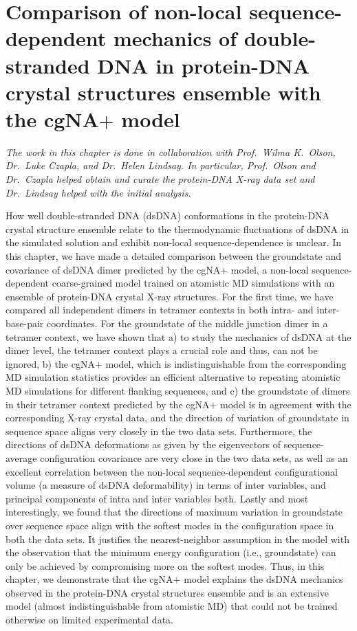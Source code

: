 \chapter{Comparison of non-local sequence-dependent mechanics of double-stranded DNA in protein-DNA crystal structures ensemble with the cgNA$+$ model}\label{c5}
\textit{The work in this chapter is done in collaboration with Prof.~Wilma K.~Olson, Dr.~Luke Czapla, and Dr.~Helen Lindsay.
In particular, Prof.~Olson and Dr.~Czapla helped obtain and curate the protein-DNA X-ray data set and Dr.~Lindsay helped with the initial analysis.}

How well double-stranded DNA (dsDNA) conformations in the protein-DNA crystal structure ensemble relate to the thermodynamic fluctuations of dsDNA in the simulated solution and exhibit non-local sequence-dependence is unclear.
In this chapter, we have made a detailed comparison between the groundstate and covariance of dsDNA dimer predicted by the cgNA$+$ model, a non-local sequence-dependent coarse-grained model trained on atomistic MD simulations with an ensemble of protein-DNA crystal X-ray structures.
For the first time, we have compared all independent dimers in tetramer contexts in both intra- and inter-base-pair coordinates. For the groundstate of the middle junction dimer in a tetramer context, we have shown that
a) to study the mechanics of dsDNA at the dimer level, the tetramer context plays a crucial role and thus, can not be ignored, b) the cgNA$+$ model, which is indistinguishable from the corresponding MD simulation statistics provides an efficient alternative to repeating atomistic MD simulations for different flanking sequences, and
c) the groundstate of dimers in their tetramer context predicted by the cgNA$+$ model is in agreement with the corresponding X-ray crystal data, and the direction of variation of groundstate in sequence space aligns very closely in the two data sets.
Furthermore, the directions of dsDNA deformations as given by the eigenvectors of sequence-average configuration covariance are very close in the two data sets, as well as an excellent correlation between the non-local sequence-dependent configurational volume (a measure of dsDNA deformability) in terms of inter variables, and principal components of intra and inter variables both.
Lastly and most interestingly, we found that the directions of maximum variation in groundstate over sequence space align with the softest modes in the configuration space in both the data sets. 
It justifies the nearest-neighbor assumption in the model with the observation that the minimum energy configuration (i.e., groundstate) can only be achieved by compromising more on the softest modes.
Thus, in this chapter, we demonstrate that the cgNA$+$ model explains the dsDNA mechanics observed in the protein-DNA crystal structures ensemble and is an extensive model (almost indistinguishable from atomistic MD) that could not be trained otherwise on limited experimental data. 

